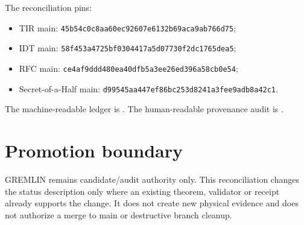The reconciliation pins:
\begin{itemize}
\item TIR main: \texttt{45b54c0c8aa60ec92607e6132b69aca9ab766d75};
\item IDT main: \texttt{58f453a4725bf0304417a5d07730f2dc1765dea5};
\item RFC main: \texttt{ce4af9ddd480ea40dfb5a3ee26ed396a58cb0e54};
\item Secret-of-a-Half main:
      \texttt{d99545aa447ef86bc253d8241a3fee9adb8a42c1}.
\end{itemize}

The machine-readable ledger is
.
The human-readable provenance audit is
.

\section{Promotion boundary}

GREMLIN remains candidate/audit authority only. This reconciliation changes the
status description only where an existing theorem, validator or receipt already
supports the change. It does not create new physical evidence and does not
authorize a merge to main or destructive branch cleanup.
